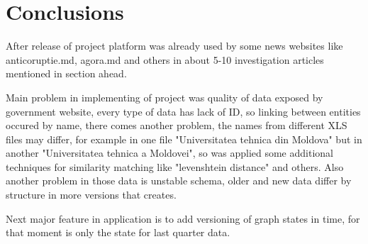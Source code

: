 \documentclass[12pt,a4paper,titlepage]{article}
\begin{document}
 

\newpage
{}
{}
\section*{Conclusions}

	After release of project platform was already used by some news websites like anticoruptie.md, agora.md and others in about 5-10 investigation articles mentioned in section ahead.
	
	 Main problem in implementing of project was quality of data exposed by government website, every type of data has lack of ID, so linking between entities occured by name, there comes another problem, the names from different XLS files may differ, for example in one file "Universitatea tehnica din Moldova" but in another "Universitatea tehnica a Moldovei", so was applied some additional techniques for similarity matching like "levenshtein distance" and others. Also another problem in those data is unstable schema, older and new data differ by structure in more versions that creates.

Next major feature in application is to add versioning of graph states in time, for that moment is only the state for last quarter data.
	 
\end{document}
